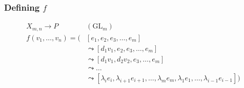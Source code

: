 \documentclass{beamer} %
\newcommand{\GLB}[1]{\GL_{#1}/B_{#1}}
\newcommand{\GL}{\mathrm{GL}}
\DeclareMathOperator{\Id}{Id}
\renewcommand{\l}{\lambda}
\begin{document}
\begin{frame}
  \frametitle{Defining $f$}
  
  \begin{align*}
    X_{m,n} \to P&(\GL_m) \\
    f(v_1,\dots,v_n) = \bigg(&\left[e_1,e_2,e_3,\dots,e_m \right] \\
    &\leadsto \left[d_1 v_1,e_2,e_3,\dots,e_m\right] \\
    &\leadsto \left[
      d_1 v_1,d_2 v_2,e_3,\dots,e_m\right] \\
    &\leadsto \dots \\
    &\leadsto \left[\l_i e_i, \l_{i+1}e_{i+1},\dots, \l_me_m,
      \l_1e_1, \dots, \l_{i-1}e_{i-1} \right]\bigg)
  \end{align*}
  
\end{frame}


\end{document}
